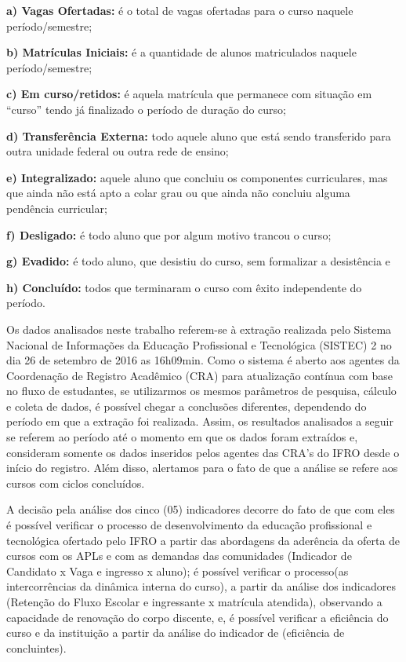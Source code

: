 \documentclass[article,12pt,onesidea,4paper,english,brazil]{abntex2}
\begin{document}
	\textbf{a) Vagas Ofertadas:} é o total de vagas ofertadas para o curso naquele período/semestre;
	
	\textbf{b) Matrículas Iniciais:} é a quantidade de alunos matriculados naquele período/semestre;
	
	\textbf{c) Em curso/retidos:} é aquela matrícula que permanece com situação em “curso” tendo já
	finalizado o período de duração do curso;
	
	\textbf{d) Transferência Externa:} todo aquele aluno que está sendo transferido para outra unidade
	federal ou outra rede de ensino;
	
	\textbf{e) Integralizado:} aquele aluno que concluiu os componentes curriculares, mas que ainda
	não está apto a colar grau ou que ainda não concluiu alguma pendência curricular;
	
	\textbf{f) Desligado:} é todo aluno que por algum motivo trancou o curso;
	
	\textbf{g) Evadido:} é todo aluno, que desistiu do curso, sem formalizar a desistência e
	
	\textbf{h) Concluído:} todos que terminaram o curso com êxito independente do período.
	
	Os dados analisados neste trabalho referem-se à extração realizada pelo Sistema Nacional de
	Informações da Educação Profissional e Tecnológica (SISTEC)
	2
	no dia 26 de setembro de 2016
	as 16h09min. Como o sistema é aberto aos agentes da Coordenação de Registro Acadêmico
	(CRA) para atualização contínua com base no fluxo de estudantes, se utilizarmos os mesmos
	parâmetros de pesquisa, cálculo e coleta de dados, é possível chegar a conclusões diferentes,
	dependendo do período em que a extração foi realizada. Assim, os resultados analisados a seguir
	se referem ao período até o momento em que os dados foram extraídos e, consideram somente os
	dados inseridos pelos agentes das CRA’s do IFRO desde o início do registro. Além disso,
	alertamos para o fato de que a análise se refere aos cursos com ciclos concluídos.
	
	A decisão pela análise dos cinco (05) indicadores decorre do fato de que com eles é possível
	verificar o processo de desenvolvimento da educação profissional e tecnológica ofertado pelo
	IFRO a partir das abordagens da aderência da oferta de cursos com os APLs e com as demandas
	das comunidades (Indicador de Candidato x Vaga e ingresso x aluno); é possível verificar o
	processo(as intercorrências da dinâmica interna do curso), a partir da análise dos indicadores
	(Retenção do Fluxo Escolar e ingressante x matrícula atendida), observando a capacidade de
	renovação do corpo discente, e, é possível verificar a eficiência do curso e da instituição a partir
	da análise do indicador de (eficiência de concluintes).
	
\end{document}
